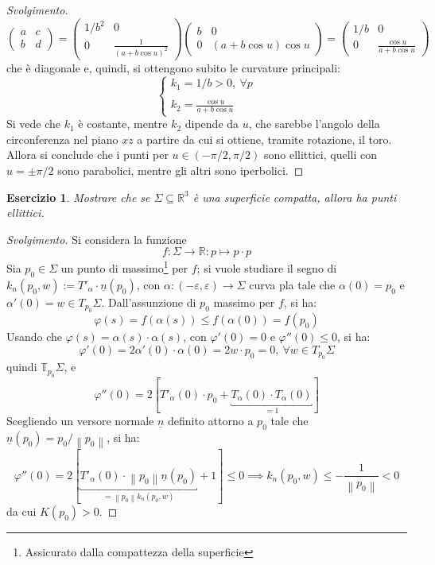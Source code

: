 \documentclass[12pt]{scrartcl}
\theoremstyle{style}
\newtheorem{esercizio}{Esercizio}[section]
\newenvironment{svolgimento}{\renewcommand\qedsymbol{$\blacksquare$}\begin{proof}[Svolgimento]}{\end{proof}}
\numberwithin{equation}{subsection}
\begin{document}
\begin{svolgimento}
\[
	\begin{pmatrix} a & c \\ b & d \end{pmatrix} = \begin{pmatrix} 1 / b^2 & 0 \\ 0 & \frac{1}{(a+b\cos u)^2} \end{pmatrix} \begin{pmatrix} b & 0 \\ 0 & (a+ b \cos u) \cos u \end{pmatrix} = \begin{pmatrix} 1 / b & 0 \\ 0 & \frac{\cos u}{a + b \cos u} \end{pmatrix} 
\] 
che \`e diagonale e, quindi, si ottengono subito le curvature principali:
\[
\begin{cases}
	 k_1 =1 / b > 0 , \ \forall p\\
	 \\
	 k_2 = \displaystyle \frac{\cos u }{a + b \cos u}
\end{cases}
\] 
Si vede che $k_1$ \`e costante, mentre $k_2$ dipende da $u$, che sarebbe l'angolo della circonferenza nel piano $xz$ a partire da cui si ottiene, tramite rotazione, il toro.
Allora si conclude che i punti per $u \in (- \pi / 2, \pi / 2)$ sono ellittici, quelli con $u = \pm\pi / 2 $ sono parabolici, mentre gli altri sono iperbolici.
\end{svolgimento}
\begin{esercizio}
Mostrare che se $\Sigma \subseteq \mathbb{R}^3$ \`e una superficie compatta, allora ha punti ellittici.
\end{esercizio}
\begin{svolgimento}
	Si considera la funzione 
	\[
	f : \Sigma \to \mathbb{R} : p \longmapsto p \cdot p
	\] 
	Sia $p_0 \in \Sigma$ un punto di massimo\footnote{Assicurato dalla compattezza della superficie} per $f$; si vuole studiare il segno di $k_n(p_0,w) := T' _\alpha \cdot \underline{n}(p_0)$, con $\alpha :(-\varepsilon ,\varepsilon ) \to \Sigma$ curva pla tale che $\alpha  (0) = p_0$ e $\alpha '(0) = w \in T_{p_0} \Sigma$.
	Dall'assunzione di $p_0$ massimo per $f$, si ha:
	\[
	\varphi (s) = f(\alpha (s)) \le f(\alpha (0)) = f(p_0)
	\] 
	Usando che $\varphi (s) = \alpha (s) \cdot \alpha (s)$, con $\varphi '(0) = 0$ e $\varphi ''(0) \le 0$, si ha:
	\[
	\varphi '(0) = 2 \alpha '(0) \cdot \alpha (0) = 2 w \cdot p_0 = 0, \ \forall w \in T_{p_0} \Sigma
	\] 
quindi $\mathbb{T}_{p_0}\Sigma$, e
\[
\varphi ''(0) = 2 [T'_\alpha (0) \cdot p_0 + \underbracket{T_\alpha (0) \cdot T_\alpha (0)}_{=1} ]
\] 
Scegliendo un versore normale $\underline{n}$ definito attorno a $p_0$ tale che $\underline{n}(p_0) = p_0 / \left\lVert p_0 \right\rVert $, si ha:
\[
	\varphi ''(0) = 2 [\underbracket{T ' _\alpha (0) \cdot \left\lVert p_0 \right\rVert \underline{n}(p_0)}_{= \left\lVert p_0 \right\rVert k_n(p_0,w)} +1]\le 0 \implies k_n(p_0,w) \le - \frac{1}{\left\lVert p_0 \right\rVert} <0
\] 
da cui $K(p_0) > 0$.
\end{svolgimento}
\end{document}
